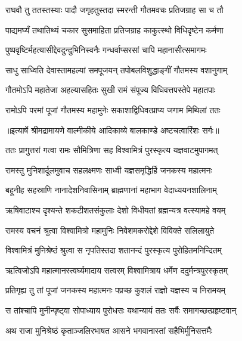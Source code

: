 \twolineshloka
{राघवौ तु ततस्तस्याः पादौ जगृहतुस्तदा}
{स्मरन्ती गौतमवचः प्रतिजग्राह सा च तौ} %

\twolineshloka
{पाद्यमर्घ्यं तथातिथ्यं चकार सुसमाहिता}
{प्रतिजग्राह काकुत्स्थो विधिदृष्टेन कर्मणा} %

\twolineshloka
{पुष्पवृष्टिर्महत्यासीद्देवदुन्दुभिनिस्वनैः}
{गन्धर्वाप्सरसां चापि महानासीत्समागमः} %

\twolineshloka
{साधु साध्विति देवास्तामहल्यां समपूजयन्}
{तपोबलविशुद्धाङ्गीं गौतमस्य वशानुगाम्} %

\twolineshloka
{गौतमोऽपि महातेजा अहल्यासहितः सुखी}
{रामं संपूज्य विधिवत्तपस्तेपे महातपाः} %

\twolineshloka
{रामोऽपि परमां पूजां गौतमस्य महामुनेः}
{सकाशाद्विधिवत्प्राप्य जगाम मिथिलां ततः} %


{॥इत्यार्षे श्रीमद्रामायणे वाल्मीकीये आदिकाव्ये बालकाण्डे अष्टचत्वारिंशः सर्गः॥}


\twolineshloka
{ततः प्रागुत्तरां गत्वा रामः सौमित्रिणा सह}
{विश्वामित्रं पुरस्कृत्य यज्ञवाटमुपागमत्} %

\twolineshloka
{रामस्तु मुनिशार्दूलमुवाच सहलक्ष्मणः}
{साध्वी यज्ञसमृद्धिर्हि जनकस्य महात्मनः} %

\twolineshloka
{बहूनीह सहस्राणि नानादेशनिवासिनाम्}
{ब्राह्मणानां महाभाग वेदाध्ययनशालिनाम्} %

\twolineshloka
{ऋषिवाटाश्च दृश्यन्ते शकटीशतसंकुलाः}
{देशो विधीयतां ब्रह्मन्यत्र वत्स्यामहे वयम्} %

\twolineshloka
{रामस्य वचनं श्रुत्वा विश्वामित्रो महामुनिः}
{निवेशमकरोद्देशे विविक्ते सलिलायुते} %

\twolineshloka
{विश्वामित्रं मुनिश्रेष्ठं श्रुत्वा स नृपतिस्तदा}
{शतानन्दं पुरस्कृत्य पुरोहितमनिन्दितम्} %

\twolineshloka
{ऋत्विजोऽपि महात्मानस्त्वर्घ्यमादाय सत्वरम्}
{विश्वामित्राय धर्मेण ददुर्मन्त्रपुरस्कृतम्} %

\twolineshloka
{प्रतिगृह्य तु तां पूजां जनकस्य महात्मनः}
{पप्रच्छ कुशलं राज्ञो यज्ञस्य च निरामयम्} %

\twolineshloka
{स तांश्चापि मुनीन्पृष्ट्वा सोपाध्याय पुरोधसः}
{यथान्यायं ततः सर्वैः समागच्छत्प्रहृष्टवान्} %

\twolineshloka
{अथ राजा मुनिश्रेष्ठं कृताञ्जलिरभाषत}
{आसने भगवानास्तां सहैभिर्मुनिसत्तमैः} %

